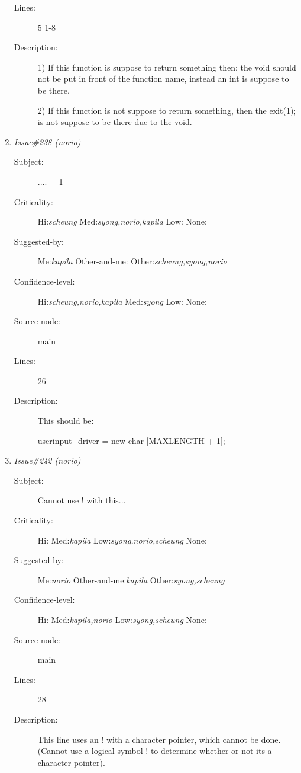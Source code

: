 \begin{enumerate}
\begin{description}
\item [Lines:] 5 1-8

\item [Description:] 1) If this function is suppose to return something then:
    the void should not be put in front of the function
    name, instead an int is suppose to be there.

 2) If this function is not suppose to return something,
    then the exit(1); is not suppose to be there due to
    the void.
\end{description}
\item {\it Issue\#238 (norio)}
\begin{description}
\item [Subject:] .... + 1
\item [Criticality:] Hi:{\it scheung} Med:{\it syong,norio,kapila} Low:{\it } None:{\it }
\item [Suggested-by:] Me:{\it kapila} Other-and-me:{\it } Other:{\it scheung,syong,norio}
\item [Confidence-level:] Hi:{\it scheung,norio,kapila} Med:{\it syong} Low:{\it } None:{\it }
\item [Source-node:] main

\item [Lines:] 26

\item [Description:] This should be:

 userinput\_driver = new char [MAXLENGTH + 1];
\end{description}
\item {\it Issue\#242 (norio)}
\begin{description}
\item [Subject:] Cannot use ! with this...
\item [Criticality:] Hi:{\it } Med:{\it kapila} Low:{\it syong,norio,scheung} None:{\it }
\item [Suggested-by:] Me:{\it norio} Other-and-me:{\it kapila} Other:{\it syong,scheung}
\item [Confidence-level:] Hi:{\it } Med:{\it kapila,norio} Low:{\it syong,scheung} None:{\it }
\item [Source-node:] main

\item [Lines:] 28

\item [Description:] This line uses an ! with a character pointer, which cannot
 be done.  (Cannot use a logical symbol ! to determine
 whether or not its a character pointer).


\end{description}
\end{enumerate}
